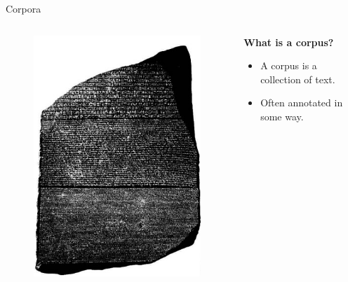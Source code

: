 \begin{frame}[allowframebreaks]{Corpora}
    \begin{columns}
        \begin{column}{0.4\textwidth}
            \begin{figure}
                \centering
                \includegraphics[width=\textwidth,height=0.9\textheight,keepaspectratio]{images/nlp-intro/corpora.png}
            \end{figure}
        \end{column}
        \begin{column}{0.6\textwidth}
            \textbf{What is a corpus?}
            \begin{itemize}
                \item A corpus is a collection of text.
                \item Often annotated in some way.

\end{itemize}
\end{column}
\end{columns}
\end{frame}
